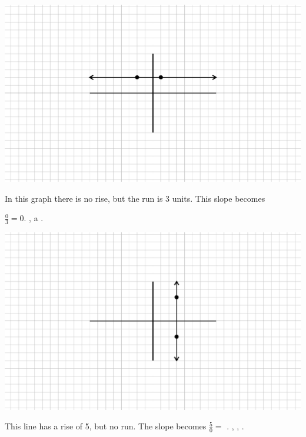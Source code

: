 \begin{example}\label{Lin48}
~\end{example}
  \begin{multicols}{2}
    \includegraphics[scale=.9,bb = 115 65 310 190, clip=true]{II_1_3c-3.eps}
    
    In this graph there is no rise, but the run is 3 units. This slope becomes
    
    $\frac{0}{3} = 0$.  ,  
       a  .
    
    
    \includegraphics[scale=.9,bb = 115 65 310 190, clip=true]{II_1_3c-4.eps}
    
    This line has a rise of 5, but no run. The slope becomes $\frac{5}{0} =$
    .  ,  
     ,   .
  \end{multicols}

